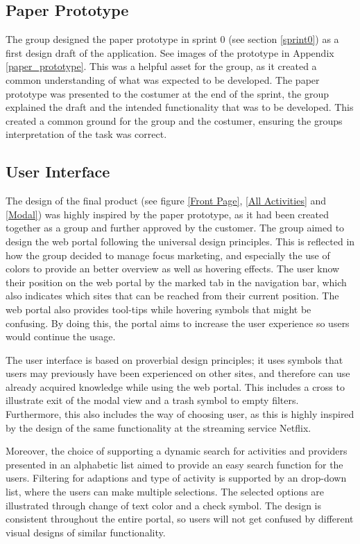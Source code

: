 \subsection{Paper Prototype} \label{ss:paper_prototype}
The group designed the paper prototype in sprint 0 (see section \ref{sprint0}) as a first design draft of the application. See images of the prototype in Appendix \ref{paper_prototype}. This was a helpful asset for the group, as it created a common understanding of what was expected to be developed. The paper prototype was presented to the costumer at the end of the sprint, the group explained the draft and the intended functionality that was to be developed. This created a common ground for the group and the costumer, ensuring the groups interpretation of the task was correct.  

\subsection{User Interface}
The design of the final product (see figure \ref{Front Page}, \ref{All Activities} and \ref{Modal}) was highly inspired by the paper prototype, as it had been created together as a group and further approved by the customer.
The group aimed to design the web portal following the universal design principles. This is reflected in how the group decided to manage focus marketing, and especially the use of colors to provide an better overview as well as hovering effects. The user know their position on the web portal by the marked tab in the navigation bar, which also indicates which sites that can be reached from their current position. The web portal also provides tool-tips while hovering symbols that might be confusing. By doing this, the portal aims to increase the user experience so users would continue the usage.

The user interface is based on proverbial design principles; it uses symbols that users may previously have been experienced on other sites, and therefore can use already acquired knowledge while using the web portal. This includes a cross to illustrate exit of the modal view and a trash symbol to empty filters. Furthermore, this also includes the way of choosing user, as this is highly inspired by the design of the same functionality at the streaming service Netflix. 

Moreover, the choice of supporting a dynamic search for activities and providers presented in an alphabetic list aimed to provide an easy search function for the users. Filtering for adaptions and type of activity is supported by an drop-down list, where the users can make multiple selections. The selected options are illustrated through change of text color and a check symbol.  The design is consistent throughout the entire portal, so users will not get confused by different visual designs of similar functionality. 

